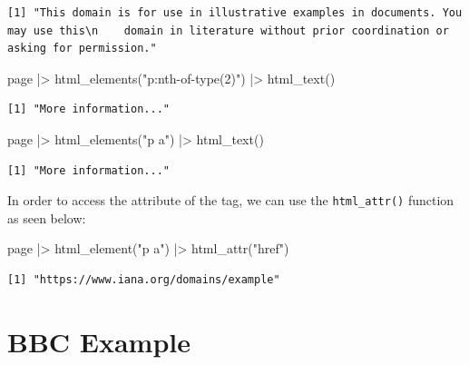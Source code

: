 \documentclass[
  letterpaper,
  DIV=11,
  numbers=noendperiod]{scrreprt}
\newenvironment{Shaded}{\begin{snugshade}}{\end{snugshade}}
\newcommand{\FunctionTok}[1]{\textcolor[rgb]{0.28,0.35,0.67}{#1}}
\newcommand{\NormalTok}[1]{\textcolor[rgb]{0.00,0.23,0.31}{#1}}
\newcommand{\SpecialCharTok}[1]{\textcolor[rgb]{0.37,0.37,0.37}{#1}}
\newcommand{\StringTok}[1]{\textcolor[rgb]{0.13,0.47,0.30}{#1}}
\begin{document}
\begin{verbatim}
[1] "This domain is for use in illustrative examples in documents. You may use this\n    domain in literature without prior coordination or asking for permission."
\end{verbatim}

\begin{Shaded}
\begin{Highlighting}[]
\NormalTok{page }\SpecialCharTok{|\textgreater{}} \FunctionTok{html\_elements}\NormalTok{(}\StringTok{"p:nth{-}of{-}type(2)"}\NormalTok{) }\SpecialCharTok{|\textgreater{}} \FunctionTok{html\_text}\NormalTok{()}
\end{Highlighting}
\end{Shaded}

\begin{verbatim}
[1] "More information..."
\end{verbatim}

\begin{Shaded}
\begin{Highlighting}[]
\NormalTok{page }\SpecialCharTok{|\textgreater{}} \FunctionTok{html\_elements}\NormalTok{(}\StringTok{"p a"}\NormalTok{) }\SpecialCharTok{|\textgreater{}} \FunctionTok{html\_text}\NormalTok{()}
\end{Highlighting}
\end{Shaded}

\begin{verbatim}
[1] "More information..."
\end{verbatim}

In order to access the attribute of the tag, we can use the
\texttt{html\_attr()} function as seen below:

\begin{Shaded}
\begin{Highlighting}[]
\NormalTok{page }\SpecialCharTok{|\textgreater{}} \FunctionTok{html\_element}\NormalTok{(}\StringTok{"p a"}\NormalTok{) }\SpecialCharTok{|\textgreater{}} \FunctionTok{html\_attr}\NormalTok{(}\StringTok{"href"}\NormalTok{)}
\end{Highlighting}
\end{Shaded}

\begin{verbatim}
[1] "https://www.iana.org/domains/example"
\end{verbatim}

\section{BBC Example}\label{bbc-example}
\end{document}

